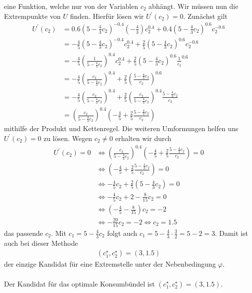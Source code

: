 eine Funktion, welche nur von der Variablen $c_2$ abhängt.
Wir müssen nun die Extrempunkte von $U$ finden. 
Hierfür lösen wir $U^\prime(c_2) = 0 $.
Zunächst gilt
\begin{equation*}
\begin{split}
U^\prime(c_2)
&= 0.6 \left( 5 - \frac{4}{3} c_2 \right)^{-0.4} \left( -\frac{4}{3} \right) c_2^{0.4}
+ 0.4 \left( 5 - \frac{4}{3} c_2 \right)^{0.6} c_2^{-0.6}\\
&= -\frac{4}{5} \left( 5 - \frac{4}{3} c_2 \right)^{-0.4}  c_2^{0.4}
+ \frac{2}{5} \left( 5 - \frac{4}{3} c_2 \right)^{0.6} c_2^{-0.6}\\
&= -\frac{4}{5} \left( \frac{1}{5 - \frac{4}{3} c_2 }\right)^{0.4}  c_2^{0.4}
+ \frac{2}{5} \left( 5 - \frac{4}{3} c_2 \right)^{0.6} \frac{1}{c_2}^{0.6}\\
&= - \frac{4}{5} \left( \frac{c_2}{5 - \frac{4}{3} c_2} \right)^{0.4}
+ \frac{2}{5} \left( \frac{5 - \frac{4}{3} c_2}{c_2}  \right)^{0.6}\\
&= - \frac{4}{5} \left( \frac{c_2}{5 - \frac{4}{3} c_2} \right)^{0.4}
+ \frac{2}{5} \left( \frac{c_2}{5 - \frac{4}{3} c_2} \right)^{0.4} \frac{5 - \frac{4}{3} c_2}{c_2}\\
&=
\left( \frac{c_2}{5 - \frac{4}{3} c_2} \right)^{0.4} \left( -\frac{4}{5} + \frac{2}{5} \frac{5 - \frac{4}{3} c_2}{c_2} \right)
\end{split}
\end{equation*}
mithilfe der Produkt und Kettenregel.
Die weiteren Umformungen helfen uns $U^\prime(c_2) = 0$ zu lösen.
Wegen $c_2 \neq 0 $ erhalten wir durch
\begin{equation*}
\begin{split}
U^\prime(c_2) = 0 
&\Leftrightarrow
\left( \frac{c_2}{5 - \frac{4}{3} c_2} \right)^{0.4} \left( -\frac{4}{5} + \frac{2}{5} \frac{5 - \frac{4}{3} c_2}{c_2} \right) = 0\\
&\Leftrightarrow
\left( -\frac{4}{5} + \frac{2}{5} \frac{5 - \frac{4}{3} c_2}{c_2} \right) = 0\\
&\Leftrightarrow
-\frac{4}{5} c_2 + \frac{2}{5}\left(5 -\frac{4}{3} c_2 \right) 
= 0 \\
& \Leftrightarrow 
-\frac{4}{5} c_2 + 2 - \frac{8}{15} c_2 = 0\\
&\Leftrightarrow
\left(- \frac{4}{5} - \frac{8}{15} \right) c_2 = -2\\
&\Leftrightarrow
-\frac{20}{15} c_2 = - 2 
\Leftrightarrow
c_2 = 1.5
\end{split}
\end{equation*}
das passende $c_2$.
Mit $c_1 = 5 - \frac{4}{3} c_2$ folgt auch $c_1 = 5 - \frac{4}{3 } \cdot \frac{3}{2} = 5 - 2 = 3$.
Damit ist auch bei dieser Methode
\begin{align*}
(c_1^\star , c_2^\star) = (3, 1.5)
\end{align*}
der einzige Kandidat für eine Extremstelle unter der Nebenbedingung $\varphi$.
\\
\\
Der Kandidat für das optimale Konsumbündel ist $(c_1^\star , c_2^\star) = (3, 1.5)$.

